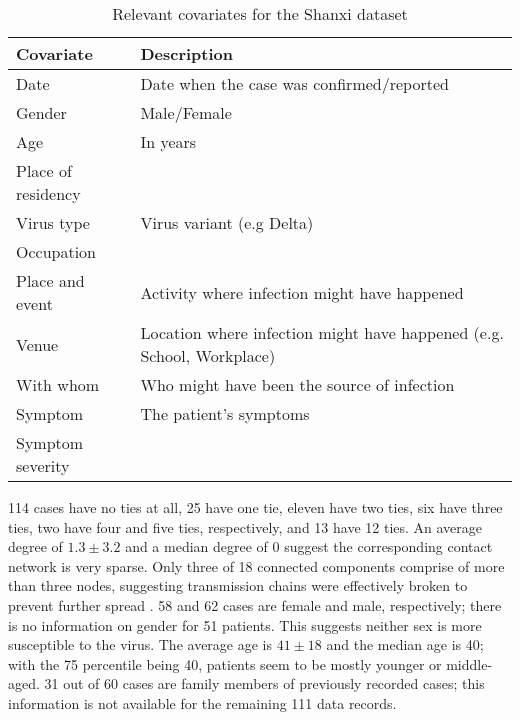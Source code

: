 \documentclass{article}
\begin{document}
\begin{table}
		\begin{tabularx}{\linewidth}{L{.4\linewidth}L{.6\linewidth}}
			\hline
			\textbf{Covariate} & \textbf{Description}\\
			\hline
			Date & Date when the case was confirmed/reported\\
			Gender & Male/Female\\
			Age & In years\\
			Place of residency & \\
			Virus type & Virus variant (e.g Delta)\\
			Occupation & \\
			Place and event & Activity where infection might have happened\\
			Venue & Location where infection might have happened (e.g. School, Workplace)\\
			With whom & Who might have been the source of infection\\
			Symptom & The patient's symptoms\\
			Symptom severity & \\
			\hline
		\end{tabularx}
		\caption{Relevant covariates for the Shanxi dataset}
		\label{tab:china_covariates}
	\end{table}
	114 cases have no ties at all, 25 have one tie, eleven have two ties, six have three ties, two have four and five ties, respectively, and 13 have 12 ties. An average degree of $1.3\pm3.2$ and a median degree of 0 suggest the corresponding contact network is very sparse. Only three of 18 connected components comprise of more than three nodes, suggesting transmission chains were effectively broken to prevent further spread \cite{hainan_publication}. 58 and 62 cases are female and male, respectively; there is no information on gender for 51 patients. This suggests neither sex is more susceptible to the virus. The average age is $41\pm18$ and the median age is 40; with the 75 percentile being 40, patients seem to be mostly younger or middle-aged. 31 out of 60 cases are family members of previously recorded cases; this information is not available for the remaining 111 data records.
	
\end{document}
